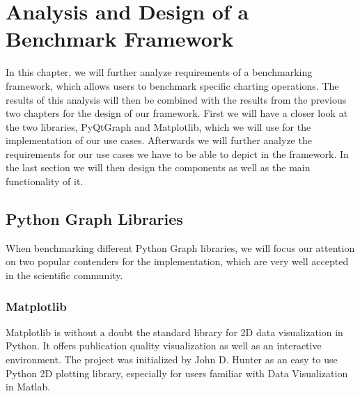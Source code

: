 

\chapter{Analysis and Design of a Benchmark Framework}
\label{ch:analysisAndDesign}

In this chapter, we will further analyze requirements of a benchmarking
framework, which allows users to benchmark specific charting operations. The
results of this analysis will then be combined with the results from the
previous two chapters for the design of our framework. First we will have a
closer look at the two libraries, PyQtGraph and Matplotlib, which we will use
for the implementation of our use cases. Afterwards we will further analyze the
requirements for our use cases we have to be able to depict in the framework. In
the last section we will then design the components as well as the main
functionality of it.



\section{Python Graph Libraries}
\label{sec:application:libraries}

When benchmarking different Python Graph libraries, we will focus our attention
on two popular contenders for the implementation, which are very well accepted
in the scientific community.

\subsection{Matplotlib}
\label{sec:application:libraries:matplotlib}

Matplotlib is without a doubt the standard library for 2D data visualization in
Python. It offers publication quality visualization as well as an interactive
environment. The project was initialized by John D. Hunter as an easy to use
Python 2D plotting library, especially for users familiar with Data
Visualization in Matlab.
\cite{Matplotlib, MatplotlibHistory}

